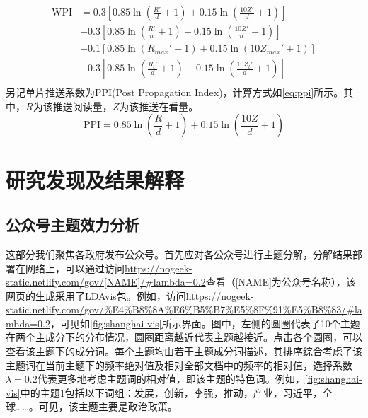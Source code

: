 \documentclass[a4paper,12pt,UTF8]{article}
\begin{document}
    \begin{equation}
      \label{eq:wpi}
      \begin{aligned}
        \text{WPI} &= 0.3\left[0.85 \ln (\frac{R'}{d} + 1)+ 0.15 \ln (\frac{10Z'}{d} + 1)\right] \\
                   &+ 0.3\left[0.85 \ln (\frac{R'}{n} + 1)+ 0.15 \ln (\frac{10Z'}{n} + 1)\right] \\
                   &+ 0.1\left[0.85 \ln (R_{max}' + 1)+ 0.15 \ln (10Z_{max}' + 1)\right] \\
                   &+ 0.3\left[0.85 \ln (\frac{R_t'}{d} + 1)+ 0.15 \ln (\frac{10Z_t'}{d} + 1)\right] \\
      \end{aligned}
    \end{equation}
    另记单片推送系数为PPI(Post Propagation Index)，计算方式如\cref{eq:ppi}所示。其中，$R$为该推送阅读量，$Z$为该推送在看量。
    \begin{equation}
      \label{eq:ppi}
      \text{PPI} = 0.85 \ln (\frac{R}{d} + 1)+ 0.15 \ln (\frac{10Z}{d} + 1)
    \end{equation}
    \section{研究发现及结果解释}
    \subsection{公众号主题效力分析}
    这部分我们聚焦各政府发布公众号。首先应对各公众号进行主题分解\cite{text2vec}，分解结果部署在网络上，可以通过访问\url{https://nogeek-static.netlify.com/gov/[NAME]/#lambda=0.2}查看（[NAME]为公众号名称），该网页的生成采用了LDAvis包\cite{sievert2014ldavis}。例如，访问\url{https://nogeek-static.netlify.com/gov/%E4%B8%8A%E6%B5%B7%E5%8F%91%E5%B8%83/#lambda=0.2}，可见如\cref{fig:shanghai-vis}所示界面。图中，左侧的圆圈代表了10个主题在两个主成分下的分布情况，圆圈距离越近代表主题越接近。点击各个圆圈，可以查看该主题下的成分词。每个主题均由若干主题成分词描述，其排序综合考虑了该主题词在当前主题下的频率绝对值及相对全部文档中的频率的相对值，选择系数$\lambda=0.2$代表更多地考虑主题词的相对值，即该主题的特色词。例如，\cref{fig:shanghai-vis}中的主题1包括以下词组：发展，创新，李强，推动，产业，习近平，全球……。可见，该主题主要是政治政策。
  
\end{document}
